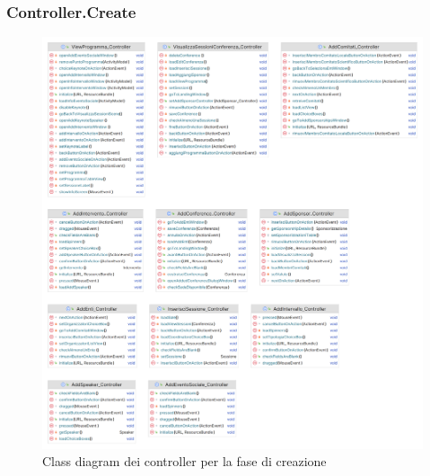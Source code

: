 \subsubsection{Controller.Create}

\begin{figure}[h!]
	\includegraphics[scale=0.17]{Immagini/Controller_Creazione.png}
	\caption{Class diagram dei controller per la fase di creazione}
\end{figure}
\newpage
